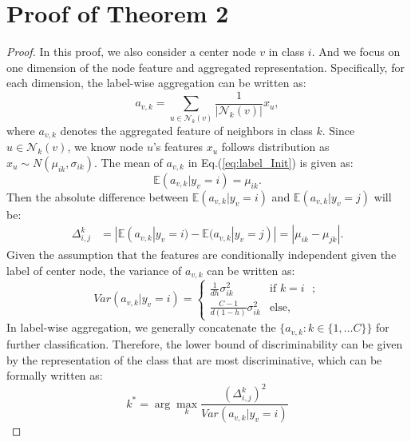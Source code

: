\section{Proof of Theorem 2}
\label{app:theorem2}
\begin{proof}
In this proof, we also consider a center node $v$ in class $i$. And we focus on one dimension of the node feature and aggregated representation.
Specifically, for each dimension, the label-wise aggregation can be written as:
\begin{equation}
    {a}_{v,k} = \sum_{u\in \mathcal{N}_k(v)} \frac{1}{|\mathcal{N}_k(v)|} {x}_u,
    \label{eq:label_Init}
\end{equation}
where ${a}_{v,k}$ denotes the aggregated feature of neighbors  in class $k$. 
Since $u \in \mathcal{N}_{k}(v)$, we know node $u$'s features ${x}_u$ follows distribution as ${x}_u \sim N(\mu_{ik},\sigma_{ik})$. 
The mean of ${a}_{v,k}$ in Eq.(\ref{eq:label_Init}) is given as:
\begin{equation}
    \mathbb{E}({a}_{v,k}|y_v=i) = \mu_{ik}.
\end{equation}
Then the absolute difference between $\mathbb{E}({a}_{v,k}|y_v=i)$ and $ \mathbb{E}({a}_{v,k}|y_v=j)$ will be:
\begin{equation}
    \begin{aligned}
        \Delta_{i,j}^{k} &  = |\mathbb{E}({a}_{v,k}|y_v=i) - \mathbb{E}({a}_{v,k}|y_v=j)| = |\mu_{ik}-\mu_{jk}|.
    \end{aligned}
\end{equation}
Given the assumption that the features are conditionally independent given the label of center node, the variance of ${a}_{v,k}$ can be written as:
\begin{equation}
    Var({a}_{v,k}|y_v=i) = \left\{ \begin{array}{ll}
         \frac{1}{dh} \sigma_{ik}^2 & \mbox{if $k = i$ } ;\\
        \frac{C-1}{d(1-h)} \sigma_{ik}^2 & \mbox{else},\end{array} \right.
\end{equation}
In label-wise aggregation, we generally concatenate the $\{{a}_{v,k}:k\in \{1,\dots C\}\}$ for further classification. Therefore, the lower bound of discriminability can be given by the representation of the class that are most discriminative, which can be formally written as:
\begin{equation}
    k^*=\arg \max_{k} \frac{(\Delta_{i,j}^k)^2}{Var({a}_{v,k}|y_v=i)}
\end{equation}

\end{proof}
